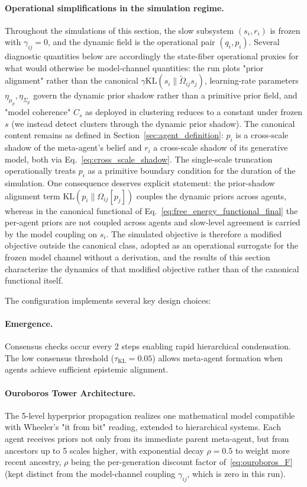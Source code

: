 \documentclass[11pt]{article}
\begin{document}
\paragraph{Operational simplifications in the simulation regime.}
Throughout the simulations of this section, the slow subsystem $(s_i, r_i)$ is frozen with $\gamma_{ij} = 0$, and the dynamic field is the operational pair $(q_i, p_i)$. Several diagnostic quantities below are accordingly the state-fiber operational proxies for what would otherwise be model-channel quantities: the run plots "prior alignment" rather than the canonical $\gamma\mathrm{KL}(s_i\|\tilde\Omega_{ij}s_j)$, learning-rate parameters $\eta_{\mu_p}, \eta_{\Sigma_p}$ govern the dynamic prior shadow rather than a primitive prior field, and "model coherence" $C_s$ as deployed in clustering reduces to a constant under frozen $s$ (we instead detect clusters through the dynamic prior shadow). The canonical content remains as defined in Section~\ref{sec:agent_definition}: $p_i$ is a cross-scale shadow of the meta-agent's belief and $r_i$ a cross-scale shadow of its generative model, both via Eq.~\eqref{eq:cross_scale_shadow}. The single-scale truncation operationally treats $p_i$ as a primitive boundary condition for the duration of the simulation. One consequence deserves explicit statement: the prior-shadow alignment term $\mathrm{KL}(p_i \| \Omega_{ij}[p_j])$ couples the dynamic priors across agents, whereas in the canonical functional of Eq.~\eqref{eq:free_energy_functional_final} the per-agent priors are not coupled across agents and slow-level agreement is carried by the model coupling on $s_i$. The simulated objective is therefore a modified objective outside the canonical class, adopted as an operational surrogate for the frozen model channel without a derivation, and the results of this section characterize the dynamics of that modified objective rather than of the canonical functional itself.

The configuration implements several key design choices:

\paragraph{Emergence.}
Consensus checks occur every 2 steps enabling rapid hierarchical condensation. The low consensus threshold ($\tau_{\mathrm{KL}} = 0.05$) allows meta-agent formation when agents achieve sufficient epistemic alignment.

\paragraph{Ouroboros Tower Architecture.}
The 5-level hyperprior propagation realizes one mathematical model compatible with Wheeler's "it from bit" reading, extended to hierarchical systems. Each agent receives priors not only from its immediate parent meta-agent, but from ancestors up to 5 scales higher, with exponential decay $\rho = 0.5$ to weight more recent ancestry, $\rho$ being the per-generation discount factor of~\eqref{eq:ouroboros_F} (kept distinct from the model-channel coupling $\gamma_{ij}$, which is zero in this run).
\end{document}
